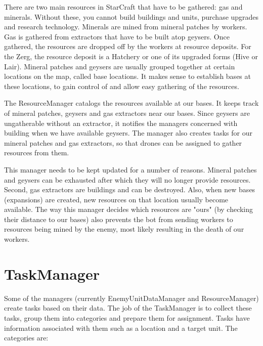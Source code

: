 There are two main resources in StarCraft that have to be gathered: gas and minerals. Without these, you cannot build buildings and units, purchase upgrades and research technology. Minerals are mined from mineral patches by workers. Gas is gathered from extractors that have to be built atop geysers. Once gathered, the resources are dropped off by the workers at resource deposits. For the Zerg, the resource deposit is a Hatchery or one of its upgraded forms (Hive or Lair). Mineral patches and geysers are usually grouped together at certain locations on the map, called base locations. It makes sense to establish bases at these locations, to gain control of and allow easy gathering of the resources.

The ResourceManager catalogs the resources available at our bases. It keeps track of mineral patches, geysers and gas extractors near our bases. Since geysers are ungatherable without an extractor, it notifies the managers concerned with building when we have available geysers. The manager also creates tasks for our mineral patches and gas extractors, so that drones can be assigned to gather resources from them.

This manager needs to be kept updated for a number of reasons. Mineral patches and geysers can be exhausted after which they will no longer provide resources. Second, gas extractors are buildings and can be destroyed. Also, when new bases (expansions) are created, new resources on that location usually become available. The way this manager decides which resources are "ours" (by checking their distance to our bases) also prevents the bot from sending workers to resources being mined by the enemy, most likely resulting in the death of our workers.

\section{TaskManager}

Some of the managers (currently EnemyUnitDataManager and ResourceManager) create tasks based on their data. The job of the TaskManager is to collect these tasks, group them into categories and prepare them for assignment. Tasks have information associated with them such as a location and a target unit. The categories are:

